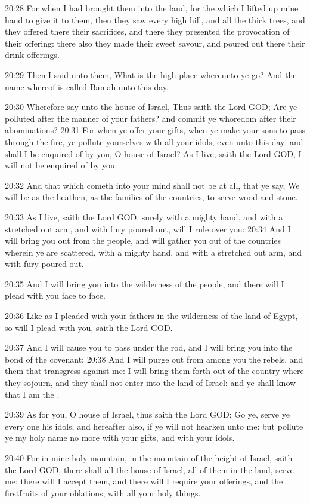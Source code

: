 20:28 For when I had brought them into the land, for the which I lifted up mine hand to give it to them, then they saw every high hill, and all the thick trees, and they offered there their sacrifices, and there they presented the provocation of their offering: there also they made their sweet savour, and poured out there their drink offerings.

20:29 Then I said unto them, What is the high place whereunto ye go?  And the name whereof is called Bamah unto this day.

20:30 Wherefore say unto the house of Israel, Thus saith the Lord GOD; Are ye polluted after the manner of your fathers? and commit ye whoredom after their abominations?  20:31 For when ye offer your gifts, when ye make your sons to pass through the fire, ye pollute yourselves with all your idols, even unto this day: and shall I be enquired of by you, O house of Israel? As I live, saith the Lord GOD, I will not be enquired of by you.

20:32 And that which cometh into your mind shall not be at all, that ye say, We will be as the heathen, as the families of the countries, to serve wood and stone.

20:33 As I live, saith the Lord GOD, surely with a mighty hand, and with a stretched out arm, and with fury poured out, will I rule over you: 20:34 And I will bring you out from the people, and will gather you out of the countries wherein ye are scattered, with a mighty hand, and with a stretched out arm, and with fury poured out.

20:35 And I will bring you into the wilderness of the people, and there will I plead with you face to face.

20:36 Like as I pleaded with your fathers in the wilderness of the land of Egypt, so will I plead with you, saith the Lord GOD.

20:37 And I will cause you to pass under the rod, and I will bring you into the bond of the covenant: 20:38 And I will purge out from among you the rebels, and them that transgress against me: I will bring them forth out of the country where they sojourn, and they shall not enter into the land of Israel: and ye shall know that I am the \LORD.

20:39 As for you, O house of Israel, thus saith the Lord GOD; Go ye, serve ye every one his idols, and hereafter also, if ye will not hearken unto me: but pollute ye my holy name no more with your gifts, and with your idols.

20:40 For in mine holy mountain, in the mountain of the height of Israel, saith the Lord GOD, there shall all the house of Israel, all of them in the land, serve me: there will I accept them, and there will I require your offerings, and the firstfruits of your oblations, with all your holy things.

